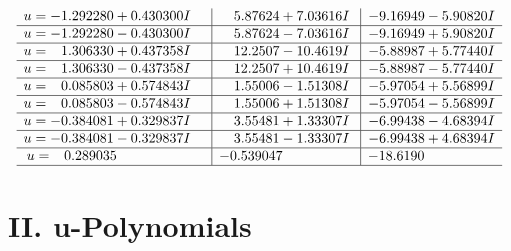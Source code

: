 \documentclass[1p]{elsarticle_modified}
\theoremstyle{definition}
\begin{document}
$$\begin{array}{c|c|c}
\begin{aligned}
u &= -1.292280 + 0.430300 I\end{aligned}
 & \phantom{-}5.87624 + 7.03616 I & -9.16949 - 5.90820 I \\ \hline\begin{aligned}
u &= -1.292280 - 0.430300 I\end{aligned}
 & \phantom{-}5.87624 - 7.03616 I & -9.16949 + 5.90820 I \\ \hline\begin{aligned}
u &= \phantom{-}1.306330 + 0.437358 I\end{aligned}
 & \phantom{-}12.2507 - 10.4619 I & -5.88987 + 5.77440 I \\ \hline\begin{aligned}
u &= \phantom{-}1.306330 - 0.437358 I\end{aligned}
 & \phantom{-}12.2507 + 10.4619 I & -5.88987 - 5.77440 I \\ \hline\begin{aligned}
u &= \phantom{-}0.085803 + 0.574843 I\end{aligned}
 & \phantom{-}1.55006 - 1.51308 I & -5.97054 + 5.56899 I \\ \hline\begin{aligned}
u &= \phantom{-}0.085803 - 0.574843 I\end{aligned}
 & \phantom{-}1.55006 + 1.51308 I & -5.97054 - 5.56899 I \\ \hline\begin{aligned}
u &= -0.384081 + 0.329837 I\end{aligned}
 & \phantom{-}3.55481 + 1.33307 I & -6.99438 - 4.68394 I \\ \hline\begin{aligned}
u &= -0.384081 - 0.329837 I\end{aligned}
 & \phantom{-}3.55481 - 1.33307 I & -6.99438 + 4.68394 I \\ \hline\begin{aligned}
u &= \phantom{-}0.289035\phantom{ +0.000000I}\end{aligned}
 & -0.539047\phantom{ +0.000000I} & -18.6190\phantom{ +0.000000I}\\
 \hline 
 \end{array}$$\newpage
\newpage\renewcommand{\arraystretch}{1}
\centering \section*{ II. u-Polynomials}
\end{document}
